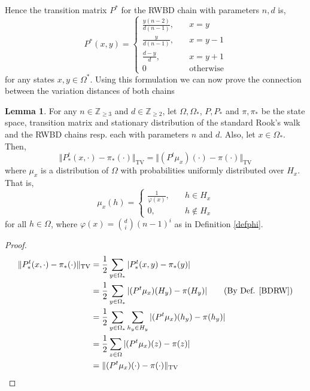 \documentclass{article}
\theoremstyle{definition}
\theoremstyle{definition}
\theoremstyle{definition}
\newtheorem{lemma}{Lemma}
\theoremstyle{definition}
\theoremstyle{named}
\begin{document}
  Hence the transition matrix $P^*$ for the RWBD chain with parameters $n,d$  is,
  \[P^*(x,y)=\begin{cases}
   \frac{y(n-2)}{d(n-1)}, \quad &x=y \\
   \frac{y}{d(n-1)}, \quad &x = y-1\\
   \frac{d-y}{d},\quad &x=y+1\\
   0 &\text{otherwise}
  \end{cases}\]for any states $x,y\in \Omega^*$. Using this formulation we can now prove the connection between the variation distances of both chains
\begin{lemma}
   \label{d}
  For any $n\in \mathbb{Z}_{\geq 3}$ and $d\in \mathbb{Z}_{ \geq 2}$, let   $\Omega,\Omega_*$, $P,P_*$ and $\pi,\pi_*$ be the state space, transition matrix and stationary distribution of the standard Rook's walk and the RWBD chains resp. each with parameters $n$ and $d$. Also, let $x\in \Omega_*$. Then,
  \[\Vert P_*^t(x,\cdot) - \pi_*(\cdot) \Vert_\text{TV} = \Vert (P^t \mu_x)(\cdot) - \pi(\cdot) \Vert_\text{TV}\]
  where $\mu_x$ is a distribution of $\Omega$ with probabilities uniformly distributed over $H_x$. That is,
   \[\mu_x(h) = \begin{cases}
      \frac{1}{\varphi(x)}, \quad &h\in H_x\\
      0, \quad &h\not\in H_x
   \end{cases}\]
   for all $h\in \Omega$, where $\varphi(x) = {d \choose i}(n-1)^i$ as in Definition \ref{defphi}.
   \begin{proof}
      \begin{align*}
         \Vert P_*^t(x,\cdot) - \pi_*(\cdot) \Vert_\text{TV} &= \frac{1}{2}\sum_{y\in \Omega_*}|P^t_*(x,y) -\pi_*(y)|\\
         &= \frac{1}{2}\sum_{y\in \Omega_*}|(P^t \mu_x)(H_y) -\pi(H_y)| \tag{By Def. \ref{BDRW}}\\
         &= \frac{1}{2}\sum_{y\in \Omega_*}\sum_{h_y\in H_y}|(P^t \mu_x)(h_y) -\pi(h_y)|\\
         &= \frac{1}{2}\sum_{z\in \Omega}|(P^t \mu_x)(z) -\pi(z)|\\
         &= \Vert (P^t \mu_x)(\cdot) - \pi(\cdot) \Vert_\text{TV}
      \end{align*}
   \end{proof}
\end{lemma}
\end{document}
